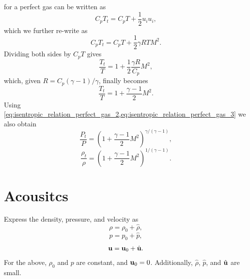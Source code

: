 \documentclass[oneside,a4paper,11pt]{report}
\begin{document}
 for a perfect gas can be written as
\begin{equation}
    C_p T_t = C_p T + \frac{1}{2} u_i u_i,
\end{equation}
which we further re-write as
\begin{equation}
    C_p T_t = C_p T + \frac{1}{2} \gamma R T M^2.
\end{equation}
Dividing both sides by $C_pT$ gives
\begin{equation}
    \frac{T_t}{T} = 1 + \frac{1}{2} \frac{\gamma R}{C_p} M^2,
\end{equation}
which, given $R = C_p (\gamma -1)/\gamma$, finally becomes
\begin{equation}
\label{eq:stagnation_temperature}
    \frac{T_t}{T} = 1 + \frac{\gamma - 1}{2} M^2.
\end{equation}
Using \cref{eq:isentropic_relation_perfect_gas_2,eq:isentropic_relation_perfect_gas_3} we also obtain
\begin{equation}
\label{eq:stagnation_pressure}
    \frac{P_t}{P} = \left ( 1 + \frac{\gamma -1}{2} M^2 \right)^{\gamma / (\gamma - 1)},
\end{equation}
\begin{equation}
\label{eq:stagnation_density}
    \frac{\rho_t}{\rho} = \left ( 1 + \frac{\gamma -1}{2} M^2 \right)^{1 / (\gamma - 1)}.
\end{equation}

\chapter{Acousitcs}

Express the density, pressure, and velocity as 
\begin{equation}
    \rho = \rho_0 + \hat{\rho},
\end{equation}
\begin{equation}
    p = p_0 + \hat{p},
\end{equation}
\begin{equation}
    \mathbf{u} = \mathbf{u}_0 + \hat{\mathbf{u}}.
\end{equation}
For the above, $\rho_0$ and $p$ are constant, and $\mathbf{u}_0 = 0$. Additionally, $\hat{\rho}$, $\hat{p}$, and $\hat{\mathbf{u}}$ are small.
\end{document}
